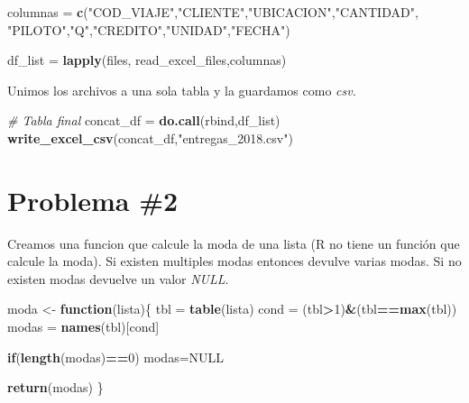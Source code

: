 \documentclass[
]{article}
\newenvironment{Shaded}{\begin{snugshade}}{\end{snugshade}}
\newcommand{\CommentTok}[1]{\textcolor[rgb]{0.56,0.35,0.01}{\textit{#1}}}
\newcommand{\ControlFlowTok}[1]{\textcolor[rgb]{0.13,0.29,0.53}{\textbf{#1}}}
\newcommand{\DecValTok}[1]{\textcolor[rgb]{0.00,0.00,0.81}{#1}}
\newcommand{\KeywordTok}[1]{\textcolor[rgb]{0.13,0.29,0.53}{\textbf{#1}}}
\newcommand{\NormalTok}[1]{#1}
\newcommand{\OperatorTok}[1]{\textcolor[rgb]{0.81,0.36,0.00}{\textbf{#1}}}
\newcommand{\OtherTok}[1]{\textcolor[rgb]{0.56,0.35,0.01}{#1}}
\newcommand{\StringTok}[1]{\textcolor[rgb]{0.31,0.60,0.02}{#1}}
\begin{document}
\begin{Shaded}
\begin{Highlighting}[]
\NormalTok{columnas =}\StringTok{ }\KeywordTok{c}\NormalTok{(}\StringTok{"COD_VIAJE"}\NormalTok{,}\StringTok{"CLIENTE"}\NormalTok{,}\StringTok{"UBICACION"}\NormalTok{,}\StringTok{"CANTIDAD"}\NormalTok{,}
             \StringTok{"PILOTO"}\NormalTok{,}\StringTok{"Q"}\NormalTok{,}\StringTok{"CREDITO"}\NormalTok{,}\StringTok{"UNIDAD"}\NormalTok{,}\StringTok{"FECHA"}\NormalTok{)}

\NormalTok{df_list =}\StringTok{ }\KeywordTok{lapply}\NormalTok{(files, read_excel_files,columnas)}
\end{Highlighting}
\end{Shaded}

Unimos los archivos a una sola tabla y la guardamos como \emph{csv}.

\begin{Shaded}
\begin{Highlighting}[]
\CommentTok{# Tabla final}
\NormalTok{concat_df =}\StringTok{ }\KeywordTok{do.call}\NormalTok{(rbind,df_list)}
\KeywordTok{write_excel_csv}\NormalTok{(concat_df,}\StringTok{"entregas_2018.csv"}\NormalTok{)}
\end{Highlighting}
\end{Shaded}

\hypertarget{problema-2}{%
\section{Problema \#2}\label{problema-2}}

Creamos una funcion que calcule la moda de una lista (R no tiene un
función que calcule la moda). Si existen multiples modas entonces
devulve varias modas. Si no existen modas devuelve un valor \emph{NULL}.

\begin{Shaded}
\begin{Highlighting}[]
\NormalTok{moda <-}\StringTok{ }\ControlFlowTok{function}\NormalTok{(lista)\{}
\NormalTok{  tbl =}\StringTok{ }\KeywordTok{table}\NormalTok{(lista)}
\NormalTok{  cond =}\StringTok{ }\NormalTok{(tbl}\OperatorTok{>}\DecValTok{1}\NormalTok{)}\OperatorTok{&}\NormalTok{(tbl}\OperatorTok{==}\KeywordTok{max}\NormalTok{(tbl))}
\NormalTok{  modas =}\StringTok{ }\KeywordTok{names}\NormalTok{(tbl)[cond]}
  
  \ControlFlowTok{if}\NormalTok{(}\KeywordTok{length}\NormalTok{(modas)}\OperatorTok{==}\DecValTok{0}\NormalTok{) modas=}\OtherTok{NULL}
  
  \KeywordTok{return}\NormalTok{(modas)}
\NormalTok{\}}
\end{Highlighting}
\end{Shaded}
\end{document}
